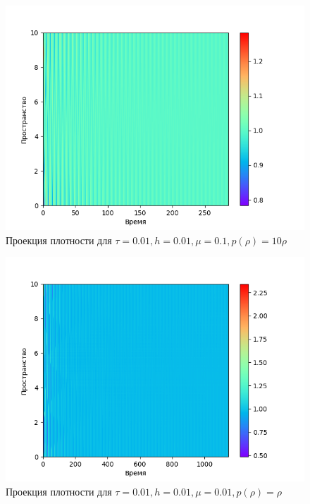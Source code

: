 \begin{center}
\begin{figure}[H]
    \centering
    \includegraphics[height=0.4\textheight]{pics/task2/h-2-2-12_2.png}
    \caption{Проекция плотности для $\tau = 0.01, h = 0.01, \mu = 0.1, p(\rho) = 10\rho$}
\end{figure}

\begin{figure}[H]
    \centering
    \includegraphics[height=0.4\textheight]{pics/task2/h-2-2-21_2.png}
    \caption{Проекция плотности для $\tau = 0.01, h = 0.01, \mu = 0.01, p(\rho) = \rho$}
\end{figure}
\end{center}



